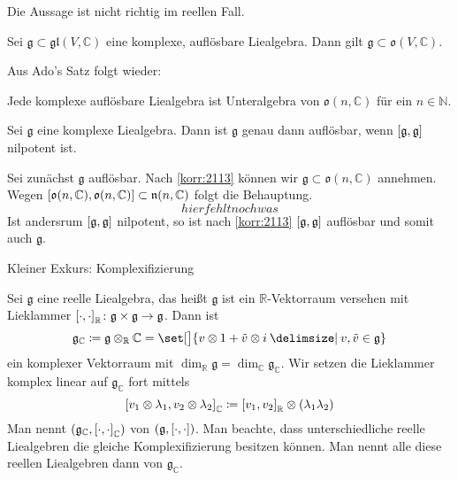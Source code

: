 \begin{bemerkung*}
	Die Aussage ist nicht richtig im reellen Fall. 
\end{bemerkung*}

\begin{korollar}
	Sei $\mathfrak{g} \subset \mathfrak{gl}(V,\mathbb{C})$ eine komplexe, auflösbare Liealgebra.
	Dann gilt $\mathfrak{g} \subset \mathfrak{o}(V,\mathbb{C})$.
\end{korollar}

Aus Ado's Satz folgt wieder:
\begin{korollar}[label=korr:2113]
	Jede komplexe auflösbare Liealgebra ist Unteralgebra von $\mathfrak{o}(n,\mathbb{C})$ für ein $n \in \mathbb{N}$.
\end{korollar}

\begin{korollar}[label=korr:2114]
	Sei $\mathfrak{g}$ eine komplexe Liealgebra.
	Dann ist $\mathfrak{g}$ genau dann auflösbar, wenn $\benbrace*{\mathfrak{g},\mathfrak{g}}$ nilpotent ist.
\end{korollar}
\begin{beweis}
	Sei zunächst $\mathfrak{g}$ auflösbar.
	Nach \autoref{korr:2113} können wir $\mathfrak{g} \subset \mathfrak{o}(n,\mathbb{C})$ annehmen.
	Wegen $\benbrace*{\mathfrak{o}(n,\mathbb{C}), \mathfrak{o}(n,\mathbb{C})} \subset \mathfrak{n}(n,\mathbb{C})$ folgt die Behauptung.
	\[
		hier fehlt noch was
	\]
	Ist andersrum $\benbrace*{\mathfrak{g},\mathfrak{g}}$ nilpotent, so ist nach \autoref{korr:2113} $\benbrace*{\mathfrak{g},\mathfrak{g}}$ auflösbar und somit auch $\mathfrak{g}$.
\end{beweis}

Kleiner Exkurs: Komplexifizierung

Sei $\mathfrak{g}$ eine reelle Liealgebra, das heißt $\mathfrak{g}$ ist ein $\mathbb{R}$-Vektorraum versehen mit Lieklammer $\benbrace*{\cdot ,\cdot }_\mathbb{R} \colon \mathfrak{g} \times \mathfrak{g} \to \mathfrak{g}$.
Dann ist 
\[
	\mathfrak{g}_\mathbb{C} \coloneqq \mathfrak{g} \otimes_\mathbb{R} \mathbb{C} = \set[\big]{v \otimes 1 + \tilde{v} \otimes i \given v , \tilde{v} \in \mathfrak{g}}
\]
ein komplexer Vektorraum mit $\dim_\mathbb{R} \mathfrak{g} = \dim_\mathbb{C} \mathfrak{g}_\mathbb{C}$.
Wir setzen die Lieklammer komplex linear auf $\mathfrak{g}_\mathbb{C}$ fort mittels
\[
	\benbrace*{v_1 \otimes \lambda_1, v_2 \otimes \lambda_2}_\mathbb{C} \coloneqq \benbrace*{v_1,v_2}_\mathbb{R} \otimes (\lambda_1 \lambda_2)
\]
Man nennt $\enbrace*{\mathfrak{g}_\mathbb{C}, \benbrace*{\cdot ,\cdot }_\mathbb{C}}$  von $\enbrace*{\mathfrak{g}, \benbrace*{\cdot ,\cdot }}$.
Man beachte, dass unterschiedliche reelle Liealgebren die gleiche Komplexifizierung besitzen können. 
Man nennt alle diese reellen Liealgebren dann  von $\mathfrak{g}_\mathbb{C}$.


